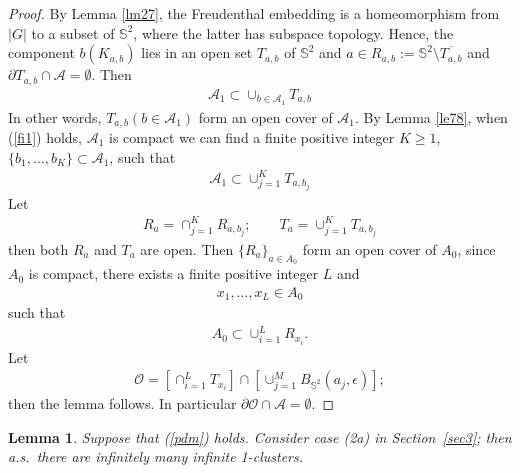 \documentclass[11pt]{amsart}
\theoremstyle{plain}
\newtheorem{lemma}[theorem]{Lemma}
\numberwithin{equation}{section}
\numberwithin{figure}{section}
\begin{document}
\begin{proof}
By Lemma \ref{lm27}, the Freudenthal embedding is a homeomorphism from $|G|$ to a subset of $\mathbb{S}^2$, where the latter has subspace topology. Hence, the component $b(K_{a,b})$ lies in an open set $T_{a,b}$ of $\mathbb{S}^2$ and $a\in R_{a,b}:=\mathbb{S}^2\setminus \overline{T_{a,b}}$ and $\partial T_{a,b}\cap \mathcal{A}=\emptyset$. Then 
\begin{align*}
\mathcal{A}_1\subset \cup_{b\in\mathcal{A}_1}T_{a,b}
\end{align*}
In other words, $T_{a,b} (b\in\mathcal{A}_1)$ form an open cover of $\mathcal{A}_1$. By Lemma \ref{le78}, when (\ref{fi1}) holds, $\mathcal{A}_1$ is compact we can find a finite positive integer $K\geq 1$, $\{b_1,\ldots,b_K\}\subset\mathcal{A}_1$, such that
\begin{align*}
\mathcal{A}_1\subset \cup_{j=1}^K T_{a,b_j}
\end{align*}
Let 
\begin{align*}
R_a=\cap_{j=1}^K R_{a,b_j};\qquad T_a=\cup_{j=1}^K T_{a,b_j}
\end{align*}
then both $R_a$ and $T_a$ are open. 
Then $\{R_a\}_{a\in A_0}$ form an open cover of $A_0$, since $A_0$ is compact, there exists a finite positive integer $L$ and
\begin{align*}
x_1,\ldots,x_L\in A_0
\end{align*}
such that 
\begin{align*}
A_0\subset \cup_{i=1}^L R_{x_i}.
\end{align*}
Let 
\begin{align*}
\mathcal{O}=[\cap_{i=1}^{L}T_{x_i}]\cap [\cup_{j=1}^M B_{\mathbb{S}^2}(a_j,\epsilon)];
\end{align*}
then the lemma follows. In particular $\partial\mathcal{O}\cap \mathcal{A}=\emptyset$.
\end{proof}





\begin{lemma}Suppose that (\ref{pdm}) holds. Consider case (2a) in Section~\ref{sec3}; then a.s.~there are infinitely many infinite 1-clusters.
\end{lemma}
\end{document}
